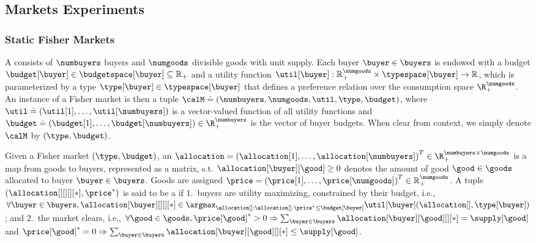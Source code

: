 \subsection{Markets Experiments}\label{sec_app:markets}

\subsubsection{Static Fisher Markets} 
A  consists of $\numbuyers$ buyers and $\numgoods$ divisible goods with unit supply\citep{brainard2000compute}.
Each buyer $\buyer \in \buyers$ is endowed with a budget $\budget[\buyer] \in \budgetspace[\buyer] \subseteq \mathbb{R}_{+}$ and a utility function $\util[\buyer]: \mathbb{R}_{+}^{\numgoods} \times \typespace[\buyer] \to \mathbb{R}$, which is parameterized by a type $\type[\buyer] \in \typespace[\buyer]$ that defines a preference relation over the consumption space $\R^\numgoods_+$. An instance of a Fisher market is then a tuple $\calM \doteq (\numbuyers, \numgoods, \util, \type, \budget)$, where $\util \doteq \left(\util[1], \hdots, \util[\numbuyers] \right)$ is a vector-valued function of all utility functions and $\budget \doteq (\budget[1], \hdots, \budget[\numbuyers]) \in \R_{+}^{\numbuyers}$ is the vector of buyer budgets.
When clear from context, we simply denote $\calM$
by $(\type, \budget)$.

Given a Fisher market $(\type, \budget)$, an  $\allocation = \left(\allocation[1], \hdots, \allocation[\numbuyers] \right)^T \in \R_+^{\numbuyers \times \numgoods}$ is a map from goods to buyers, represented as a matrix, s.t. $\allocation[\buyer][\good] \ge 0$ denotes the amount of good $\good \in \goods$ allocated to buyer $\buyer \in \buyers$. Goods are assigned  $\price = \left(\price[1], \hdots, \price[\numgoods] \right)^T \in \mathbb{R}_+^{\numgoods}$. A tuple $(\allocation[][][][*], \price^*)$ is said to be a  \citep{arrow-debreu, walras} if 
1.~buyers are utility maximizing, constrained by their budget, i.e., $\forall \buyer \in \buyers, \allocation[\buyer][][][*] \in \argmax_{\allocation[ ] : \allocation[ ] \cdot \price^* \leq \budget[\buyer]} \util[\buyer](\allocation[ ], \type[\buyer])$;
and 2.~the market clears, i.e., $\forall \good \in \goods,  \price[\good]^* > 0 \Rightarrow \sum_{\buyer \in \buyers} \allocation[\buyer][\good][][*] = \supply[\good]$ and $\price[\good]^* = 0 \Rightarrow\sum_{\buyer \in \buyers} \allocation[\buyer][\good][][*] \leq \supply[\good]$.

